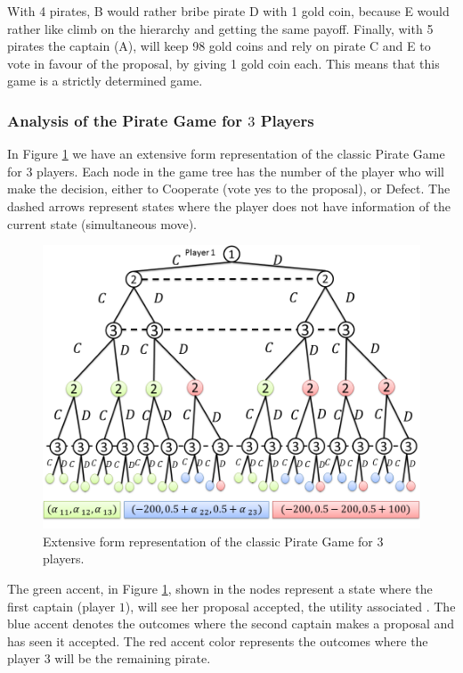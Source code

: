 With 4 pirates, B would rather bribe pirate D with 1 gold coin, because E would rather like climb on the hierarchy and getting the same payoff. Finally, with 5 pirates the captain (A), will keep 98 gold coins and rely on pirate C and E to vote in favour of the proposal, by giving 1 gold coin each. This means that this game is a strictly determined game.

\subsubsection{Analysis of the Pirate Game for $3$ Players}
\label{subsubsec:analysis_PG3players}

In Figure \ref{fig:pg_architecturegametree:extensiveform} we have an extensive form representation of the classic Pirate Game for $3$ players. Each node in the game tree has the number of the player who will make the decision, either to Cooperate (vote yes to the proposal), or Defect. The dashed arrows represent states where the player does not have information of the current state (simultaneous move). 

\begin{figure}[h]
\centering 
\includegraphics[scale=0.60]{Figures/1.5qubit/FigurasRevistas/Slide1.png}
\caption{Extensive form representation of the classic Pirate Game for $3$ players. }
\label{fig:pg_architecturegametree:extensiveform}
\end{figure}

The green accent, in Figure \ref{fig:pg_architecturegametree:extensiveform}, shown in the nodes represent a state where the first captain (player $1$), will see her proposal accepted, the utility associated . The blue accent denotes the outcomes where the second captain makes a proposal and has seen it accepted. The red accent color represents the outcomes where the player $3$ will be the remaining pirate.


